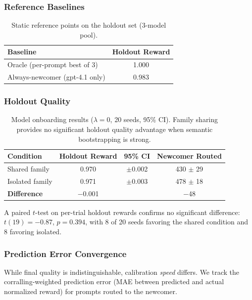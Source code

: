\subsubsection{Reference Baselines}

\begin{table}[h]
\centering
\caption{Static reference points on the holdout set (3-model pool).}
\label{tab:onboarding_baselines}
\small
\begin{tabular}{@{}lc@{}}
\toprule
\textbf{Baseline} & \textbf{Holdout Reward} \\
\midrule
Oracle (per-prompt best of 3) & 1.000 \\
Always-newcomer (gpt-4.1 only) & 0.983 \\
\bottomrule
\end{tabular}
\end{table}

\subsubsection{Holdout Quality}

\begin{table}[h]
\centering
\caption{Model onboarding results ($\lambda{=}0$, 20 seeds, 95\% CI).
Family sharing provides no significant holdout quality advantage when
semantic bootstrapping is strong.}
\label{tab:model_onboarding}
\small
\begin{tabular}{@{}lccc@{}}
\toprule
\textbf{Condition} & \textbf{Holdout Reward} & \textbf{95\% CI}
  & \textbf{Newcomer Routed} \\
\midrule
Shared family   & 0.970 & $\pm$0.002 & 430 $\pm$ 29 \\
Isolated family & 0.971 & $\pm$0.003 & 478 $\pm$ 18 \\
\midrule
\textbf{Difference} & $-$0.001 & & $-$48 \\
\bottomrule
\end{tabular}
\end{table}

\noindent A paired $t$-test on per-trial holdout rewards confirms no
significant difference: $t(19){=}{-}0.87$, $p{=}0.394$, with 8 of 20
seeds favoring the shared condition and 8 favoring isolated.

\subsubsection{Prediction Error Convergence}

While final quality is indistinguishable, calibration \emph{speed}
differs.  We track the corralling-weighted prediction error (MAE between
predicted and actual normalized reward) for prompts routed to the
newcomer.

